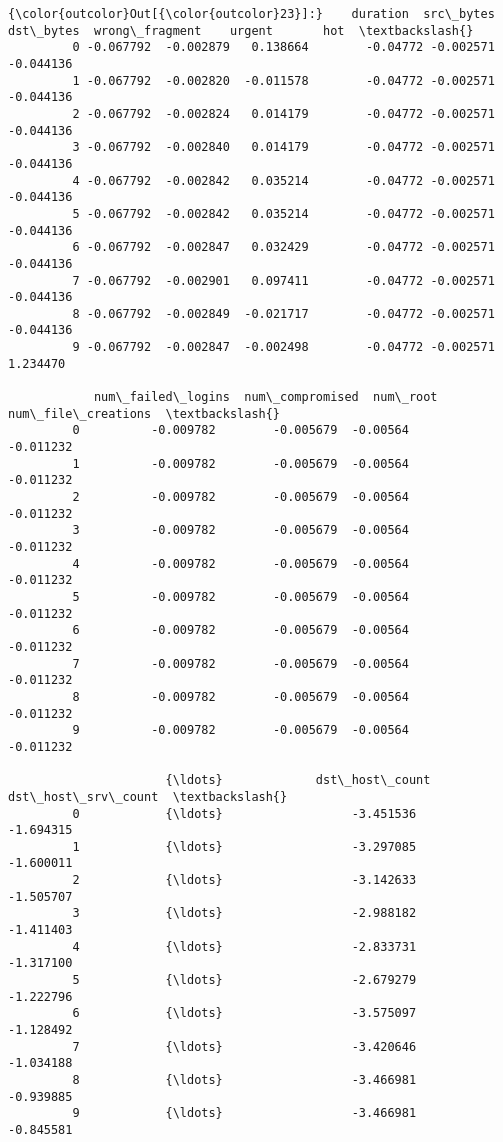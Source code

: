 \documentclass[11pt]{article}
\begin{document}
\begin{Verbatim}[commandchars=\\\{\}]
{\color{outcolor}Out[{\color{outcolor}23}]:}    duration  src\_bytes  dst\_bytes  wrong\_fragment    urgent       hot  \textbackslash{}
         0 -0.067792  -0.002879   0.138664        -0.04772 -0.002571 -0.044136   
         1 -0.067792  -0.002820  -0.011578        -0.04772 -0.002571 -0.044136   
         2 -0.067792  -0.002824   0.014179        -0.04772 -0.002571 -0.044136   
         3 -0.067792  -0.002840   0.014179        -0.04772 -0.002571 -0.044136   
         4 -0.067792  -0.002842   0.035214        -0.04772 -0.002571 -0.044136   
         5 -0.067792  -0.002842   0.035214        -0.04772 -0.002571 -0.044136   
         6 -0.067792  -0.002847   0.032429        -0.04772 -0.002571 -0.044136   
         7 -0.067792  -0.002901   0.097411        -0.04772 -0.002571 -0.044136   
         8 -0.067792  -0.002849  -0.021717        -0.04772 -0.002571 -0.044136   
         9 -0.067792  -0.002847  -0.002498        -0.04772 -0.002571  1.234470   
         
            num\_failed\_logins  num\_compromised  num\_root  num\_file\_creations  \textbackslash{}
         0          -0.009782        -0.005679  -0.00564           -0.011232   
         1          -0.009782        -0.005679  -0.00564           -0.011232   
         2          -0.009782        -0.005679  -0.00564           -0.011232   
         3          -0.009782        -0.005679  -0.00564           -0.011232   
         4          -0.009782        -0.005679  -0.00564           -0.011232   
         5          -0.009782        -0.005679  -0.00564           -0.011232   
         6          -0.009782        -0.005679  -0.00564           -0.011232   
         7          -0.009782        -0.005679  -0.00564           -0.011232   
         8          -0.009782        -0.005679  -0.00564           -0.011232   
         9          -0.009782        -0.005679  -0.00564           -0.011232   
         
                      {\ldots}             dst\_host\_count  dst\_host\_srv\_count  \textbackslash{}
         0            {\ldots}                  -3.451536           -1.694315   
         1            {\ldots}                  -3.297085           -1.600011   
         2            {\ldots}                  -3.142633           -1.505707   
         3            {\ldots}                  -2.988182           -1.411403   
         4            {\ldots}                  -2.833731           -1.317100   
         5            {\ldots}                  -2.679279           -1.222796   
         6            {\ldots}                  -3.575097           -1.128492   
         7            {\ldots}                  -3.420646           -1.034188   
         8            {\ldots}                  -3.466981           -0.939885   
         9            {\ldots}                  -3.466981           -0.845581   
         

\end{Verbatim}
\end{document}
